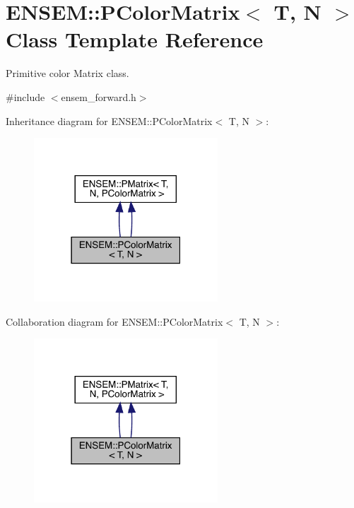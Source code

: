 \hypertarget{classENSEM_1_1PColorMatrix}{}\section{E\+N\+S\+EM\+:\+:P\+Color\+Matrix$<$ T, N $>$ Class Template Reference}
\label{classENSEM_1_1PColorMatrix}


Primitive color Matrix class.  




{\ttfamily \#include $<$ensem\+\_\+forward.\+h$>$}



Inheritance diagram for E\+N\+S\+EM\+:\+:P\+Color\+Matrix$<$ T, N $>$\+:\nopagebreak
\begin{figure}[H]
\begin{center}
\leavevmode
\includegraphics[width=195pt]{d5/d16/classENSEM_1_1PColorMatrix__inherit__graph}
\end{center}
\end{figure}


Collaboration diagram for E\+N\+S\+EM\+:\+:P\+Color\+Matrix$<$ T, N $>$\+:\nopagebreak
\begin{figure}[H]
\begin{center}
\leavevmode
\includegraphics[width=195pt]{d0/df4/classENSEM_1_1PColorMatrix__coll__graph}
\end{center}
\end{figure}
